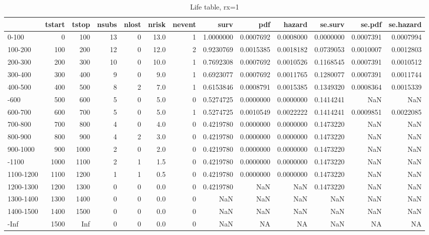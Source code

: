 \documentclass[
]{article}
\begin{document}
\begin{table}[H]

\caption{\label{tab:life_table_rx1}Life table, rx=1}
\centering
\fontsize{7}{9}\selectfont
\begin{tabular}[t]{lrrrrrrrrrrrr}
\toprule
  & tstart & tstop & nsubs & nlost & nrisk & nevent & surv & pdf & hazard & se.surv & se.pdf & se.hazard\\
\midrule
0-100 & 0 & 100 & 13 & 0 & 13.0 & 1 & 1.0000000 & 0.0007692 & 0.0008000 & 0.0000000 & 0.0007391 & 0.0007994\\
100-200 & 100 & 200 & 12 & 0 & 12.0 & 2 & 0.9230769 & 0.0015385 & 0.0018182 & 0.0739053 & 0.0010007 & 0.0012803\\
200-300 & 200 & 300 & 10 & 0 & 10.0 & 1 & 0.7692308 & 0.0007692 & 0.0010526 & 0.1168545 & 0.0007391 & 0.0010512\\
300-400 & 300 & 400 & 9 & 0 & 9.0 & 1 & 0.6923077 & 0.0007692 & 0.0011765 & 0.1280077 & 0.0007391 & 0.0011744\\
400-500 & 400 & 500 & 8 & 2 & 7.0 & 1 & 0.6153846 & 0.0008791 & 0.0015385 & 0.1349320 & 0.0008364 & 0.0015339\\
\addlinespace
500-600 & 500 & 600 & 5 & 0 & 5.0 & 0 & 0.5274725 & 0.0000000 & 0.0000000 & 0.1414241 & NaN & NaN\\
600-700 & 600 & 700 & 5 & 0 & 5.0 & 1 & 0.5274725 & 0.0010549 & 0.0022222 & 0.1414241 & 0.0009851 & 0.0022085\\
700-800 & 700 & 800 & 4 & 0 & 4.0 & 0 & 0.4219780 & 0.0000000 & 0.0000000 & 0.1473220 & NaN & NaN\\
800-900 & 800 & 900 & 4 & 2 & 3.0 & 0 & 0.4219780 & 0.0000000 & 0.0000000 & 0.1473220 & NaN & NaN\\
900-1000 & 900 & 1000 & 2 & 0 & 2.0 & 0 & 0.4219780 & 0.0000000 & 0.0000000 & 0.1473220 & NaN & NaN\\
\addlinespace
1000-1100 & 1000 & 1100 & 2 & 1 & 1.5 & 0 & 0.4219780 & 0.0000000 & 0.0000000 & 0.1473220 & NaN & NaN\\
1100-1200 & 1100 & 1200 & 1 & 1 & 0.5 & 0 & 0.4219780 & 0.0000000 & 0.0000000 & 0.1473220 & NaN & NaN\\
1200-1300 & 1200 & 1300 & 0 & 0 & 0.0 & 0 & 0.4219780 & NaN & NaN & 0.1473220 & NaN & NaN\\
1300-1400 & 1300 & 1400 & 0 & 0 & 0.0 & 0 & NaN & NaN & NaN & NaN & NaN & NaN\\
1400-1500 & 1400 & 1500 & 0 & 0 & 0.0 & 0 & NaN & NaN & NaN & NaN & NaN & NaN\\
\addlinespace
1500-Inf & 1500 & Inf & 0 & 0 & 0.0 & 0 & NaN & NA & NA & NaN & NA & NA\\
\bottomrule
\end{tabular}
\end{table}
\end{document}
